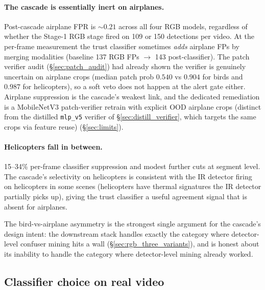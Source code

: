 \documentclass[12pt,a4paper,oneside,openright]{book}
\begin{document}
\paragraph{The cascade is essentially inert on airplanes.}
Post-cascade airplane FPR is $\sim 0.21$ across all four RGB models, regardless of whether the Stage-1 RGB stage fired on 109 or 150 detections per video. At the per-frame measurement the trust classifier sometimes \emph{adds} airplane FPs by merging modalities (baseline 137 RGB FPs $\to$ 143 post-classifier). The patch verifier audit (\S\ref{sec:patch_audit}) had already shown the verifier is genuinely uncertain on airplane crops (median patch prob $0.540$ vs $0.904$ for birds and $0.987$ for helicopters), so a soft veto does not happen at the alert gate either. Airplane suppression is the cascade's weakest link, and the dedicated remediation is a MobileNetV3 patch-verifier retrain with explicit OOD airplane crops (distinct from the distilled \texttt{mlp\_v5} verifier of \S\ref{sec:distill_verifier}, which targets the same crops via feature reuse) (\S\ref{sec:limits}).

\paragraph{Helicopters fall in between.}
15--34\% per-frame classifier suppression and modest further cuts at segment level. The cascade's selectivity on helicopters is consistent with the IR detector firing on helicopters in some scenes (helicopters have thermal signatures the IR detector partially picks up), giving the trust classifier a useful agreement signal that is absent for airplanes.

The bird-vs-airplane asymmetry is the strongest single argument for the cascade's design intent: the downstream stack handles exactly the category where detector-level confuser mining hits a wall (\S\ref{sec:rgb_three_variants}), and is honest about its inability to handle the category where detector-level mining already worked.

\subsection{Classifier choice on real video}
\label{sec:realvideo_classifier}
\end{document}

